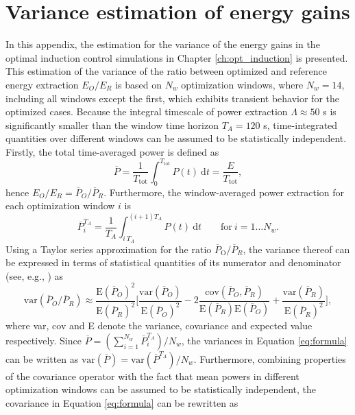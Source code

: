 \chapter{Variance estimation of energy gains}\label{ch:app_variance}

In this appendix, the estimation for the variance of the energy gains in the optimal induction control simulations in Chapter \ref{ch:opt_induction} is presented. 
This estimation of the variance of the ratio between optimized and reference energy extraction $E_O/E_R$ is based on $N_w$ optimization windows, where $N_w = 14$, including all windows except the first, which exhibits transient behavior for the optimized cases. Because the integral timescale of power extraction $\Lambda \approx 50$ s is significantly smaller than the window time horizon $T_A = 120$ s, time-integrated quantities over different windows can be assumed to be statistically independent. Firstly, the total time-averaged power is defined as 
\begin{equation}
\overline{P} = \frac{1}{T_\text{tot}} \int_{0}^{T_\text{tot}} P(t)~\text{d}t = \frac{E}{T_\text{tot}},
\end{equation}
hence $E_O/E_R = \overline{P}_O / \overline{P}_R$. Furthermore, the window-averaged power extraction for each optimization window $i$ is 
\begin{equation}
\overline{P}_{i}^{T_A} = \frac{1}{T_A} \int_{i\ T_A}^{(i+1)T_A} P(t)~\text{d}t \qquad \text{for}~i = 1 \dots N_w.
\end{equation}
\noindent Using a Taylor series approximation for the ratio $\overline{P}_{\text{O}} / \overline{P}_R$, the variance thereof can be expressed in terms of statistical quantities of its numerator and denominator (see, e.g., \citealp{kendalladvanced}) as 
\begin{equation}\label{eq:formula}
\text{var} (\overline{P}_O / \overline{P}_R) \approx \frac{\text{E}(\overline{P}_O)^2}{\text{E}(\overline{P}_R)^2} \bigg[ \frac{\text{var}(\overline{P}_O)}{\text{E}(\overline{P}_O)^2} - 2\frac{\text{cov}(\overline{P}_O, \overline{P}_R)}{\text{E}(\overline{P}_{R})\text{E}(\overline{P}_O)} + \frac{\text{var} (\overline{P}_R)}{\text{E}(\overline{P}_R)^2}  \bigg],
\end{equation}
\noindent where var, cov and E denote the variance, covariance and expected value respectively. Since $\overline{P} = (\sum_{i=1}^{N_w}\overline{P}_i^{T_A})/N_w$, the variances in Equation \eqref{eq:formula} can be written as $\text{var}(\overline{P}) = \text{var}(\overline{P}^{T_A})/N_w$. Furthermore, combining properties of the covariance operator with the fact that mean powers in different optimization windows can be assumed to be statistically independent, the covariance in Equation \eqref{eq:formula} can be rewritten as 
